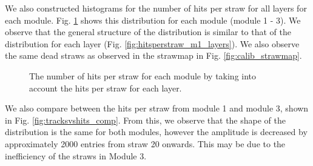 \documentclass[a4paper]{report}
\numberwithin{equation}{section}
\begin{document}
We also constructed histograms for the number of hits per straw for all layers for each module. Fig. \ref{fig:hitsperstraw_modules} shows this distribution for 
each module (module 1 - 3). We observe that the general structure of the distribution is similar to that of the distribution for 
each layer (Fig. \ref{fig:hitsperstraw_m1_layers}). We also observe the same dead straws as observed in the strawmap in Fig. \ref{fig:calib_strawmap}.


\begin{figure}[htb!]
	\centering
	\quad
	\centering
	\quad
	\centering
	\caption{The number of hits per straw for each module by taking into account the hits per straw for each layer. }
	\label{fig:hitsperstraw_modules}
\end{figure}

We also compare between the hits per straw from module 1 and module 3, shown in Fig. \ref{fig:tracksvshits_comp}. From this, we observe that the shape of the 
distribution is the same for both modules, however the amplitude is decreased by approximately 2000 entries from straw 20 onwards. This may be due to the inefficiency of the straws in Module 3. 
\end{document}
